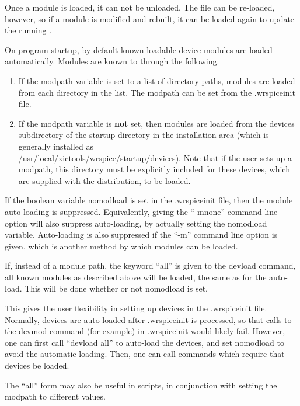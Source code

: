 Once a module is loaded, it can not be unloaded.  The file can be
re-loaded, however, so if a module is modified and rebuilt, it can be
loaded again to update the running {\WRspice}.

On program startup, by default known loadable device modules are
loaded automatically.  Modules are known to {\WRspice} through the
following.

\begin{enumerate}
\item{If the {\vt modpath} variable is set to a list of directory
paths, modules are loaded from each directory in the list.  The {\vt
modpath} can be set from the {\vt .wrspiceinit} file.}

\item{If the {\vt modpath} variable is {\bf not} set, then modules are
loaded from the {\vt devices} subdirectory of the {\vt startup}
directory in the installation area (which is generally installed as\\
{\vt /usr/local/xictools/wrspice/startup/devices}).  Note that if the
user sets up a {\vt modpath}, this directory must be explicitly
included for these devices, which are supplied with the {\WRspice}
distribution, to be loaded.}
\end{enumerate}

If the boolean variable {\vt nomodload} is set in the {\vt
.wrspiceinit} file, then the module auto-loading is suppressed. 
Equivalently, giving the ``{\vt -mnone}'' command line option will
also suppress auto-loading, by actually setting the {\vt nomodload}
variable.  Auto-loading is also suppressed if the ``{\vt -m}'' command
line option is given, which is another method by which modules can be
loaded.

If, instead of a module path, the keyword ``{\vt all}'' is given to
the {\cb devload} command, all known modules as described above will
be loaded, the same as for the auto-load.  This will be done whether
or not {\vt nomodload} is set.

This gives the user flexibility in setting up devices in the {\vt
.wrspiceinit} file.  Normally, devices are auto-loaded after {\vt
.wrspiceinit} is processed, so that calls to the {\cb devmod} command
(for example) in {\vt .wrspiceinit} would likely fail.  However, one
can first call ``{\vt devload all}'' to auto-load the devices, and set
{\vt nomodload} to avoid the automatic loading.  Then, one can call
commands which require that devices be loaded.

The ``{\vt all}'' form may also be useful in scripts, in conjunction
with setting the {\vt modpath} to different values.

